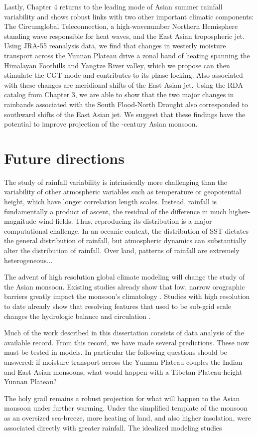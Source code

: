 Lastly, Chapter 4 returns to the leading mode of Asian summer rainfall variability and shows robust links with two other important climatic components: The Circumglobal Teleconnection, a high-wavenumber Northern Hemisphere standing wave responsible for heat waves, and the East Asian tropospheric jet. Using JRA-55 reanalysis data, we find that changes in westerly moisture transport across the Yunnan Plateau drive a zonal band of heating spanning the Himalayan Foothills and Yangtze River valley, which we propose can then stimulate the CGT mode and contributes to its phase-locking. Also associated with these changes are meridional shifts of the East Asian jet. Using the RDA catalog from Chapter 3, we are able to show that the two major changes in rainbands associated with the South Flood-North Drought also corresponded to southward shifts of the East Asian jet. We suggest that these findings have the potential to improve projection of the -century Asian monsoon. 

\section{Future directions}

	The study of rainfall variability is intrinsically more challenging than the variability of other atmospheric variables such as temperature or geopotential height, which have longer correlation length scales. Instead, rainfall is fundamentally a product of ascent, the residual of the difference in much higher-magnitude wind fields. Thus, reproducing its distribution is a major computational challenge. In an oceanic context, the distribution of SST dictates the general distribution of rainfall, but atmospheric dynamics can substantially alter the distribution of rainfall. Over land, patterns of rainfall are extremely heterogeneous...

	The advent of high resolution global climate modeling will change the study of the Asian monsoon. Existing studies already show that low, narrow orographic barriers greatly impact the monsoon's climatology \citep{Xie2006}. Studies with high resolution to date already show that resolving features that used to be sub-grid scale changes the hydrologic balance and circulation \citep{Risi2010,WU CITE}.
	
	Much of the work described in this dissertation consists of data analysis of the available record. From this record, we have made several predictions. These now must be tested in models. In particular the following questions should be answered: if moisture transport across the Yunnan Plateau couples the Indian and East Asian monsoons, what would happen with a Tibetan Plateau-height Yunnan Plateau?
	
	The holy grail remains a robust projection for what will happen to the Asian monsoon under further warming. Under the simplified template of the monsoon as an oversized sea-breeze, more heating of land, and also higher insolation, were associated directly with greater rainfall. The idealized modeling studies 